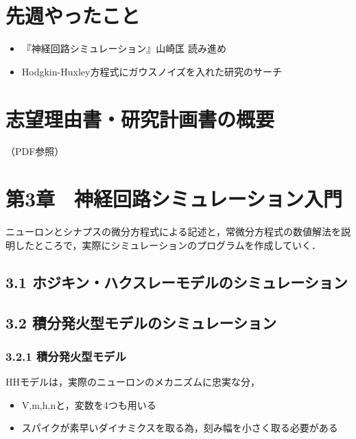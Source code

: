 \documentclass[dvipdfmx, A4j, twocolumn, 10.5pt]{jsarticle}
\begin{document}


\section{先週やったこと}
\begin{itemize}
 \item 『神経回路シミュレーション』山崎匡 読み進め
 \item Hodgkin-Huxley方程式にガウスノイズを入れた研究のサーチ

\end{itemize}
\section{志望理由書・研究計画書の概要}
（PDF参照）


\section*{第3章　神経回路シミュレーション入門}

ニューロンとシナプスの微分方程式による記述と，常微分方程式の数値解法を説明したところで，実際にシミュレーションのプログラムを作成していく．


\subsection*{3.1 ホジキン・ハクスレーモデルのシミュレーション}


\subsection*{3.2 積分発火型モデルのシミュレーション}
\subsubsection*{3.2.1 積分発火型モデル}

HHモデルは，実際のニューロンのメカニズムに忠実な分，
\begin{itemize}
 \item V,m,h,nと，変数を4つも用いる
 \item スパイクが素早いダイナミクスを取る為，刻み幅を小さく取る必要がある
\end{itemize}
\end{document}
